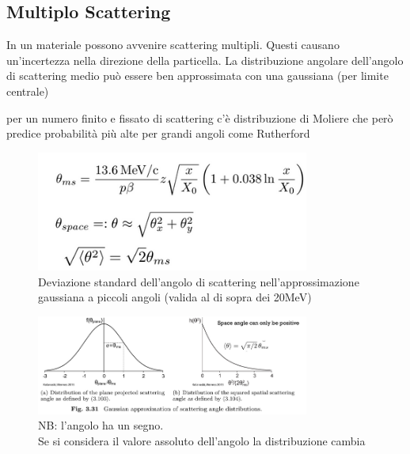 \subsection{Multiplo Scattering}
In un materiale possono avvenire scattering multipli. Questi causano un'incertezza nella direzione della particella.
La distribuzione angolare dell'angolo di scattering medio può essere ben approssimata  con una gaussiana (per limite centrale)
\begin{remark}
    per un numero finito e fissato di scattering c'è distribuzione di Moliere che però predice probabilità più alte per grandi angoli come Rutherford
\end{remark}
\begin{figure}[H]
    \centering
    \includegraphics[width=0.8\textwidth,frame]{Chapters/images/Interazione_radiazione_materia/image-20220217025524958.png}
    \captionsetup{width=0.8\linewidth}
    \caption{Deviazione standard dell'angolo di scattering nell'approssimazione gaussiana a piccoli angoli (valida al di sopra dei 20MeV)}
    \label{multiplescattering}
\end{figure}
\begin{figure}[H]
    \centering
    \includegraphics[width=0.8\textwidth,frame]{Chapters/images/Interazione_radiazione_materia/image-20220217030024845.png}
    \captionsetup{width=0.8\linewidth}
    \caption{NB: l'angolo ha un segno.\\Se si considera il valore assoluto dell'angolo la distribuzione cambia}
    \label{fig:mmscatteringradius}
\end{figure}

